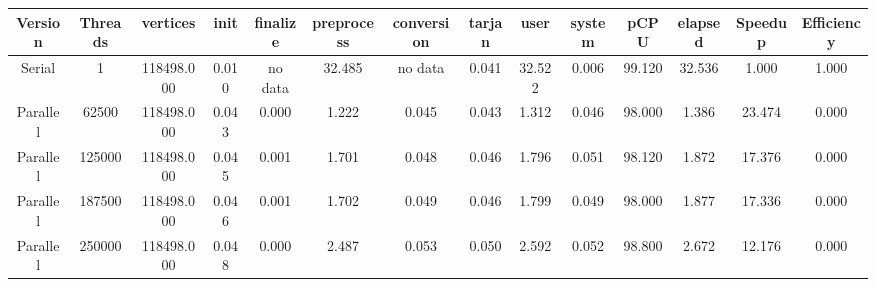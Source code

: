 \begin{tabular}{|c|c|c|c|c|c|c|c|c|c|c|c|c|c|}
\toprule
 Version &  Threads &   vertices &  init & finalize &  preprocess & conversion &  tarjan &   user &  system &   pCPU &  elapsed &  Speedup &  Efficiency \\
\midrule
  Serial &        1 & 118498.000 & 0.010 &  no data &      32.485 &    no data &   0.041 & 32.522 &   0.006 & 99.120 &   32.536 &    1.000 &       1.000 \\
Parallel &    62500 & 118498.000 & 0.043 &    0.000 &       1.222 &      0.045 &   0.043 &  1.312 &   0.046 & 98.000 &    1.386 &   23.474 &       0.000 \\
Parallel &   125000 & 118498.000 & 0.045 &    0.001 &       1.701 &      0.048 &   0.046 &  1.796 &   0.051 & 98.120 &    1.872 &   17.376 &       0.000 \\
Parallel &   187500 & 118498.000 & 0.046 &    0.001 &       1.702 &      0.049 &   0.046 &  1.799 &   0.049 & 98.000 &    1.877 &   17.336 &       0.000 \\
Parallel &   250000 & 118498.000 & 0.048 &    0.000 &       2.487 &      0.053 &   0.050 &  2.592 &   0.052 & 98.800 &    2.672 &   12.176 &       0.000 \\
\bottomrule
\end{tabular}
